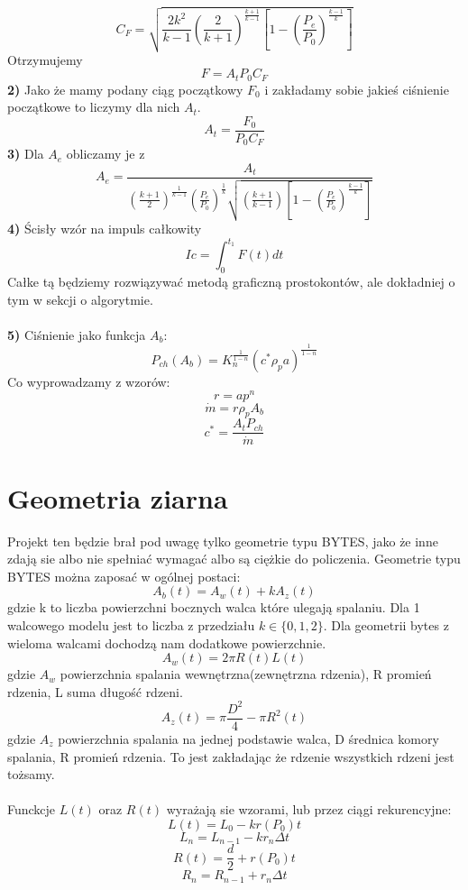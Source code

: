 \documentclass{article}
\begin{document}
\begin{equation} C_F=\sqrt{\frac{2k^2}{k-1}\left(\frac{2}{k+1}\right)^{\frac{k+1}{k-1}}\left[1-\left(\frac{P_e}{P_0}\right)^{\frac{k-1}{k}}\right]} \end{equation}
Otrzymujemy 
\begin{equation} F=A_tP_0C_F\end{equation}
\textbf{2)} Jako że mamy podany ciąg początkowy $F_0$ i zakładamy sobie jakieś ciśnienie początkowe to liczymy dla nich $A_t$. 
\begin{equation} A_t=\frac{F_0}{P_0C_F} \end{equation}
\textbf{3)} Dla $A_e$ obliczamy je z
\begin{equation}A_e=\frac{A_t}{\left(\frac{k+1}{2}\right)^{\frac{1}{k-1}}\left(\frac{P_e}{P_0}\right)^{\frac{1}{k}}\sqrt{\left(\frac{k+1}{k-1}\right)\left[1-\left(\frac{P_e}{P_0}\right)^{\frac{k-1}{k}}\right]}}\end{equation}
\textbf{4)} Ścisły wzór na impuls całkowity
$$Ic=\int^{t_1}_0F(t)dt$$
Całke tą będziemy rozwiązywać metodą graficzną prostokontów, ale dokładniej o tym w sekcji o algorytmie.\\\\
\textbf{5)} Ciśnienie jako funkcja $A_b$:
\begin{equation}P_{ch}(A_b)=K_n^{\frac{1}{1-n}}(c^*\rho_pa)^{\frac{1}{1-n}}\end{equation}
Co wyprowadzamy z wzorów:
$$r=ap^n$$
$$\dot{m}=r\rho_pA_b$$
$$c^*=\frac{A_tP_{ch}}{\dot{m}}$$

\section{Geometria ziarna}
Projekt ten będzie brał pod uwagę tylko geometrie typu BYTES, jako że inne zdają sie albo nie spełniać wymagać albo są ciężkie do policzenia. Geometrie typu BYTES można zaposać w ogólnej postaci:
$$A_b(t)=A_w(t)+kA_z(t)$$
gdzie k to liczba powierzchni bocznych walca które ulegają spalaniu. Dla 1 walcowego modelu jest to liczba z przedziału $k\in\{0, 1, 2\}$. Dla geometrii bytes z wieloma walcami dochodzą nam dodatkowe powierzchnie.
$$A_w(t)=2\pi R(t)L(t)$$
gdzie  $A_w$ powierzchnia spalania wewnętrzna(zewnętrzna rdzenia), R promień rdzenia, L suma długość rdzeni. 
$$A_z(t)=\pi \frac{D^2}{4} - \pi R^2(t)$$
gdzie $A_z$ powierzchnia spalania na jednej podstawie walca, D średnica komory spalania, R promień rdzenia. To jest zakładając że rdzenie wszystkich rdzeni jest tożsamy.\\\\
Funckcje $L(t)$ oraz $R(t)$ wyrażają sie wzorami, lub przez ciągi rekurencyjne:
$$L(t)=L_0 - kr(P_0)t$$
$$L_n=L_{n-1} - kr_n\Delta t$$
$$R(t)=\frac{d}{2} + r(P_0)t$$
$$R_n=R_{n-1}+r_n\Delta t$$
\end{document}
